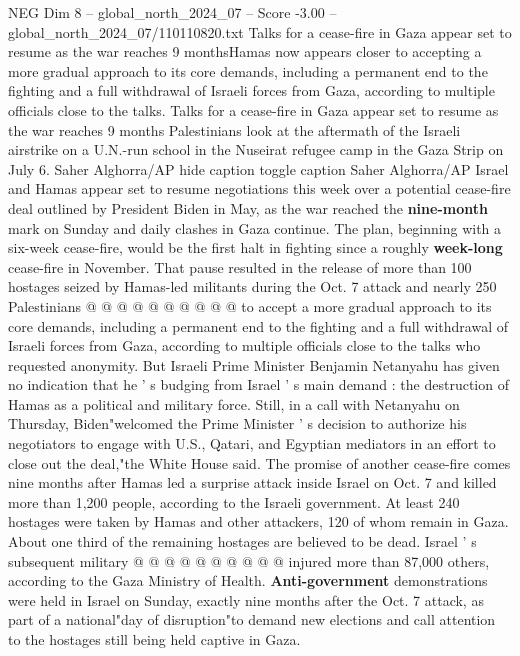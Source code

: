 \begin{textsample}{NEG Dim 8 – global\_north\_2024\_07 – Score -3.00 – global\_north\_2024\_07/110110820.txt}  \label{ex:f8_neg_178}
Talks for a cease-fire in Gaza appear set to resume as the war reaches 9 monthsHamas now appears closer to accepting a more gradual approach to its core demands, including a permanent end to the fighting and a full withdrawal of Israeli forces from Gaza, according to multiple officials close to the talks.
Talks for a cease-fire in Gaza appear set to resume as the war reaches 9 months Palestinians look at the aftermath of the Israeli airstrike on a U.N.-run school in the Nuseirat refugee camp in the Gaza Strip on July 6.
Saher Alghorra/AP hide caption toggle caption Saher Alghorra/AP Israel and Hamas appear set to resume negotiations this week over a potential cease-fire deal outlined by President Biden in May, as the war reached the \textbf{nine-month} mark on Sunday and daily clashes in Gaza continue.
The plan, beginning with a six-week cease-fire, would be the first halt in fighting since a roughly \textbf{week-long} cease-fire in November.
That pause resulted in the release of more than 100 hostages seized by Hamas-led militants during the Oct. 7 attack and nearly 250 Palestinians @ @ @ @ @ @ @ @ @ @ to accept a more gradual approach to its core demands, including a permanent end to the fighting and a full withdrawal of Israeli forces from Gaza, according to multiple officials close to the talks who requested anonymity.
But Israeli Prime Minister Benjamin Netanyahu has given no indication that he ' s budging from Israel ' s main demand : the destruction of Hamas as a political and military force.
Still, in a call with Netanyahu on Thursday, Biden"welcomed the Prime Minister ' s decision to authorize his negotiators to engage with U.S., Qatari, and Egyptian mediators in an effort to close out the deal,"the White House said.
The promise of another cease-fire comes nine months after Hamas led a surprise attack inside Israel on Oct. 7 and killed more than 1,200 people, according to the Israeli government.
At least 240 hostages were taken by Hamas and other attackers, 120 of whom remain in Gaza.
About one third of the remaining hostages are believed to be dead.
Israel ' s subsequent military @ @ @ @ @ @ @ @ @ @ injured more than 87,000 others, according to the Gaza Ministry of Health. \textbf{Anti-government} demonstrations were held in Israel on Sunday, exactly nine months after the Oct. 7 attack, as part of a national"day of disruption"to demand new elections and call attention to the hostages still being held captive in Gaza.

\end{textsample}
